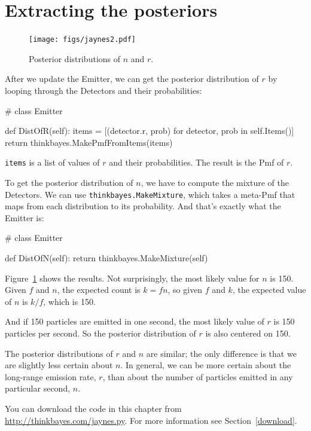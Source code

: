 \documentclass[12pt]{book}
\theoremstyle{exercise}
\newcommand{\py}[1]{{\tt #1}}%
\begin{document}
\section{Extracting the posteriors}

\begin{figure}
\centerline{\texttt{[image: figs/jaynes2.pdf]}}
\caption{Posterior distributions of $n$ and $r$.}
\label{fig.jaynes2}
\end{figure}

After we update the Emitter, we can get the posterior distribution
of $r$ by looping through the Detectors and their probabilities:

\begin{code}
# class Emitter

    def DistOfR(self):
        items = [(detector.r, prob) for detector, prob in self.Items()]
        return thinkbayes.MakePmfFromItems(items)
\end{code}

\py{items} is a list of values of $r$ and their probabilities.
The result is the Pmf of $r$.

To get the posterior distribution of $n$, we have to compute
the mixture of the Detectors.  We can use
\py{thinkbayes.MakeMixture}, which takes a meta-Pmf that maps
from each distribution to its probability.  And that's exactly
what the Emitter is:

\begin{code}
# class Emitter

    def DistOfN(self):
        return thinkbayes.MakeMixture(self)
\end{code}

Figure~\ref{fig.jaynes2} shows the results.  Not surprisingly, the
most likely value for $n$ is 150.  Given $f$ and $n$, the expected
count is $k = f n$, so given $f$ and $k$, the expected value of $n$ is
$k / f$, which is 150.

And if 150 particles are emitted in one second, the most likely value
of $r$ is 150 particles per second.  So the posterior distribution of
$r$ is also centered on 150.

The posterior distributions of $r$ and $n$ are similar;
the only difference is that we are slightly less certain about $n$.
In general, we can be more certain about the long-range emission rate,
$r$, than about the number of particles emitted in any particular second,
$n$.

You can download the code in this chapter from
\url{http://thinkbayes.com/jaynes.py}.  For more information see
Section~\ref{download}.
\end{document}
